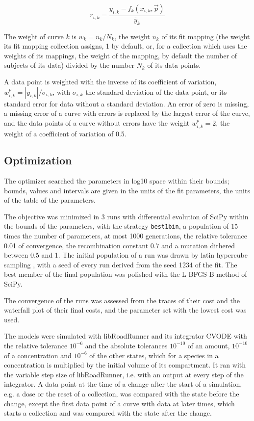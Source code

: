 \begin{equation}
r_{i,k} = \frac{y_{i,k} - f_k(x_{i,k}, \vec{p})}{\overline{y}_k}
\end{equation}

The weight of curve $k$ is $w_k = n_k / N_k$, the weight $n_k$ of its fit mapping (the weight its fit mapping collection assigns, 1 by default, or, for a collection which uses the weights of its mappings, the weight of the mapping, by default the number of subjects of its data) divided by the number $N_k$ of its data points.

A data point is weighted with the inverse of its coefficient of variation, $w^{p}_{i,k} = |y_{i,k}| / \sigma_{i,k}$, with $\sigma_{i,k}$ the standard deviation of the data point, or its standard error for data without a standard deviation. An error of zero is missing, a missing error of a curve with errors is replaced by the largest error of the curve, and the data points of a curve without errors have the weight $w^{p}_{i,k} = 2$, the weight of a coefficient of variation of 0.5.

\subsection{Optimization}

The optimizer searched the parameters in log10 space within their bounds; bounds, values and intervals are given in the units of the fit parameters, the units of the table of the parameters.

The objective was minimized in 3 runs with differential evolution \cite{Storn1997} of SciPy \cite{Virtanen2020} within the bounds of the parameters, with the strategy \texttt{best1bin}, a population of 15 times the number of parameters, at most 1000 generations, the relative tolerance 0.01 of convergence, the recombination constant 0.7 and a mutation dithered between 0.5 and 1. The initial population of a run was drawn by latin hypercube sampling \cite{McKay1979}, with a seed of every run derived from the seed 1234 of the fit. The best member of the final population was polished with the L-BFGS-B method of SciPy.

The convergence of the runs was assessed from the traces of their cost and the waterfall plot of their final costs, and the parameter set with the lowest cost was used.

The models were simulated with libRoadRunner \cite{Welsh2023} and its integrator CVODE \cite{Hindmarsh2005} with the relative tolerance $10^{-6}$ and the absolute tolerances $10^{-10}$ of an amount, $10^{-10}$ of a concentration and $10^{-6}$ of the other states, which for a species in a concentration is multiplied by the initial volume of its compartment. It ran with the variable step size of libRoadRunner, i.e. with an output at every step of the integrator. A data point at the time of a change after the start of a simulation, e.g. a dose or the reset of a collection, was compared with the state before the change, except the first data point of a curve with data at later times, which starts a collection and was compared with the state after the change.

